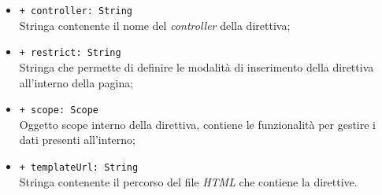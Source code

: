 \begin{itemize}
\begin{itemize}
		\item \texttt{+ controller: String} \\ Stringa contenente il nome del \textit{controller} della direttiva;
		\item \texttt{+ restrict: String} \\ Stringa che permette di definire le modalità di inserimento della direttiva all'interno della pagina;
		\item \texttt{+ scope: Scope} \\ Oggetto scope interno della direttiva, contiene le funzionalità per gestire i dati presenti all'interno;
		\item \texttt{+ templateUrl: String} \\ Stringa contenente il percorso del file \textit{HTML} che contiene la direttive.
	\end{itemize}
\end{itemize}